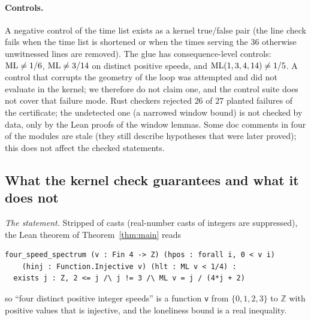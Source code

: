 \documentclass[11pt]{article}
\theoremstyle{remark}
\newcommand{\Z}{\mathbb{Z}}
\begin{document}
\paragraph{Controls.} A negative control of the time list exists as a kernel true/false pair (the line check fails when the time list is shortened or when the times serving the $36$ otherwise unwitnessed lines are removed). The glue has consequence-level controls: $\mathrm{ML}\ne1/6$, $\mathrm{ML}\ne3/14$ on distinct positive speeds, and $\mathrm{ML}(1,3,4,14)\ne1/5$. A control that corrupts the geometry of the loop was attempted and did not evaluate in the kernel; we therefore do not claim one, and the control suite does not cover that failure mode. Rust checkers rejected $26$ of $27$ planted failures of the certificate; the undetected one (a narrowed window bound) is not checked by data, only by the Lean proofs of the window lemmas. Some doc comments in four of the modules are stale (they still describe hypotheses that were later proved); this does not affect the checked statements.

\subsection{What the kernel check guarantees and what it does not}\label{sec:guarantee}

\emph{The statement.} Stripped of casts (real-number casts of integers are suppressed), the Lean theorem of Theorem~\ref{thm:main} reads
\begin{verbatim}
four_speed_spectrum (v : Fin 4 -> Z) (hpos : forall i, 0 < v i)
    (hinj : Function.Injective v) (hlt : ML v < 1/4) :
  exists j : Z, 2 <= j /\ j != 3 /\ ML v = j / (4*j + 2)
\end{verbatim}
so ``four distinct positive integer speeds'' is a function \texttt{v} from $\{0,1,2,3\}$ to $\Z$ with positive values that is injective, and the loneliness bound is a real inequality.
\end{document}
